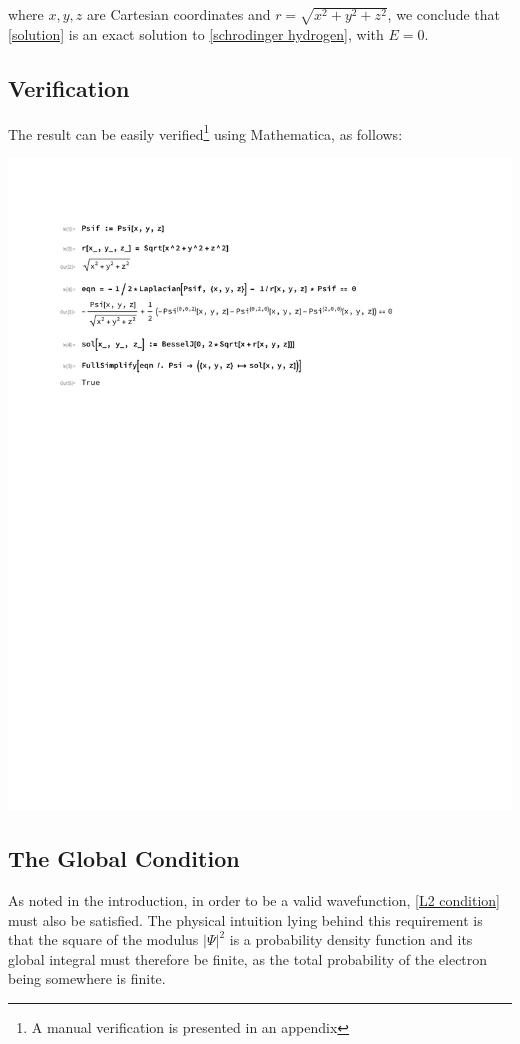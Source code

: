 \documentclass{article}
\begin{document}
where $x,y,z$ are Cartesian coordinates and $r=\sqrt{x^2+y^2+z^2}$, we conclude that
\eqref{solution} is an exact solution to \eqref{schrodinger hydrogen}, with $E=0$.

\subsection*{Verification}

\label{verification}
The result can be easily verified\footnote{A manual verification is presented in an appendix} using Mathematica, as follows:

\includegraphics[page=1, clip, trim=1in 7in 1in 1in, width=\textwidth]{improved.pdf}

\subsection*{The Global Condition}

As noted in the introduction, in order to be a valid wavefunction, \eqref{L2 condition} must also be satisfied.
The physical intuition lying behind this requirement is that the square of the modulus $|\Psi|^2$ is a probability
density function and its global integral must therefore be finite, as the total probability of the electron
being somewhere is finite. \cite[\S 1.4]{Griffiths}
\end{document}
